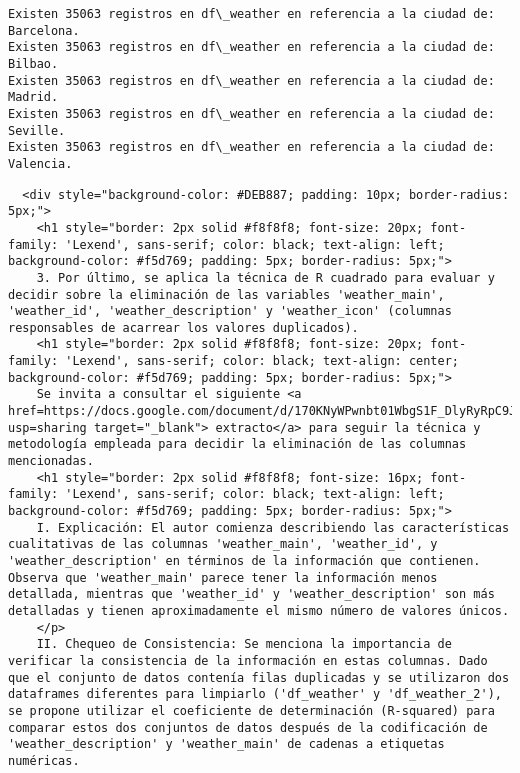 \documentclass[11pt]{article}
\begin{document}
    \begin{Verbatim}[commandchars=\\\{\}]
Existen 35063 registros en df\_weather en referencia a la ciudad de:  Barcelona.
Existen 35063 registros en df\_weather en referencia a la ciudad de: Bilbao.
Existen 35063 registros en df\_weather en referencia a la ciudad de: Madrid.
Existen 35063 registros en df\_weather en referencia a la ciudad de: Seville.
Existen 35063 registros en df\_weather en referencia a la ciudad de: Valencia.
    \end{Verbatim}

    \begin{verbatim}
  <div style="background-color: #DEB887; padding: 10px; border-radius: 5px;">
    <h1 style="border: 2px solid #f8f8f8; font-size: 20px; font-family: 'Lexend', sans-serif; color: black; text-align: left; background-color: #f5d769; padding: 5px; border-radius: 5px;">
    3. Por último, se aplica la técnica de R cuadrado para evaluar y decidir sobre la eliminación de las variables 'weather_main', 'weather_id', 'weather_description' y 'weather_icon' (columnas responsables de acarrear los valores duplicados).
    <h1 style="border: 2px solid #f8f8f8; font-size: 20px; font-family: 'Lexend', sans-serif; color: black; text-align: center; background-color: #f5d769; padding: 5px; border-radius: 5px;">
    Se invita a consultar el siguiente <a href=https://docs.google.com/document/d/170KNyWPwnbt01WbgS1F_DlyRyRpC9Jc8yjNgVvbDjd4/edit?usp=sharing target="_blank"> extracto</a> para seguir la técnica y metodología empleada para decidir la eliminación de las columnas mencionadas.
    <h1 style="border: 2px solid #f8f8f8; font-size: 16px; font-family: 'Lexend', sans-serif; color: black; text-align: left; background-color: #f5d769; padding: 5px; border-radius: 5px;">
    I. Explicación: El autor comienza describiendo las características cualitativas de las columnas 'weather_main', 'weather_id', y 'weather_description' en términos de la información que contienen. Observa que 'weather_main' parece tener la información menos detallada, mientras que 'weather_id' y 'weather_description' son más detalladas y tienen aproximadamente el mismo número de valores únicos.
    </p>
    II. Chequeo de Consistencia: Se menciona la importancia de verificar la consistencia de la información en estas columnas. Dado que el conjunto de datos contenía filas duplicadas y se utilizaron dos dataframes diferentes para limpiarlo ('df_weather' y 'df_weather_2'), se propone utilizar el coeficiente de determinación (R-squared) para comparar estos dos conjuntos de datos después de la codificación de 'weather_description' y 'weather_main' de cadenas a etiquetas numéricas.

\end{verbatim}
\end{document}
